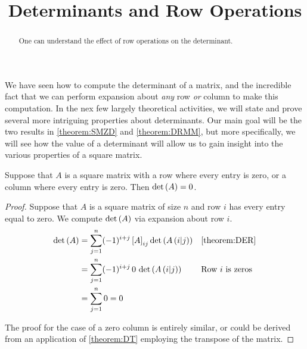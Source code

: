 \documentclass{ximera}
\title{Determinants and Row Operations}
\begin{document}
\begin{abstract}
  One can understand the effect of row operations on the determinant.
\end{abstract}
\maketitle

We have seen how to compute the determinant of a matrix, and the
incredible fact that we can perform expansion about \textit{any} row
\textit{or} column to make this computation.  In the nex few largely
theoretical activities, we will state and prove several more
intriguing properties about determinants.  Our main goal will be the
two results in \ref{theorem:SMZD} and \ref{theorem:DRMM}, but more
specifically, we will see how the value of a determinant will allow us
to gain insight into the various properties of a square matrix.

\begin{theorem}
\label{theorem:DZRC}

Suppose that $A$ is a square matrix with a row where every entry is
zero, or a column where every entry is zero.  Then $\det\left(A\right)=0$.

\begin{proof}
  Suppose that $A$ is a square matrix of size $n$ and row $i$ has every entry equal to zero.  We compute $\det\left(A\right)$ via expansion about row $i$.
  \begin{align*}
    \det\left(A\right)
    &=
      \sum_{j=1}^{n}(-1)^{i+j}\left\lbrack A\right\rbrack_{ij}\det\left(A\left(i|j\right)\right)
    &&\ref{theorem:DER}\\
    &=
      \sum_{j=1}^{n}(-1)^{i+j}\,0\,\det\left(A\left(i|j\right)\right)
    &&\text{Row $i$ is zeros}\\
    &=
      \sum_{j=1}^{n}0=0
  \end{align*}
  
  The proof for the case of a zero column is entirely similar, or
  could be derived from an application of \ref{theorem:DT} employing
  the transpose of the matrix.
\end{proof}
\end{theorem}
\end{document}
